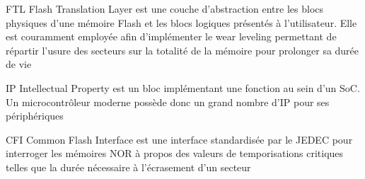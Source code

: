 {FTL}
{Flash Translation Layer}
{est une couche d'abstraction entre les blocs physiques d'une mémoire Flash et les blocs logiques présentés à l'utilisateur. Elle est couramment employée afin d'implémenter le wear leveling permettant de répartir l'usure des secteurs sur la totalité de la mémoire pour prolonger sa durée de vie}


{IP}
{Intellectual Property}
{est un bloc implémentant une fonction au sein d'un \gls{SoC}. Un microcontrôleur moderne possède donc un grand nombre d'IP pour ses périphériques}


{CFI}
{Common Flash Interface}
{est une interface standardisée par le JEDEC pour interroger les mémoires NOR à propos des valeurs de temporisations critiques telles que la durée nécessaire à l'écrasement d'un secteur}